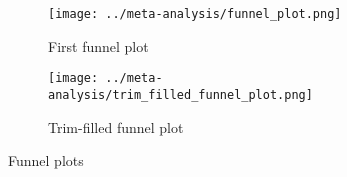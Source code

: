 \begin{figure}[p]

\centering

\begin{subfigure}[b]{0.4\textwidth}
\centering
\texttt{[image: ../meta-analysis/funnel\_plot.png]}
\caption{First funnel plot}
\label{fig:funnel_plot}
\end{subfigure}
\begin{subfigure}[b]{0.4\textwidth}
\centering
\texttt{[image: ../meta-analysis/trim\_filled\_funnel\_plot.png]}
\caption{Trim-filled funnel plot}
\label{fig:trim_filled_funnel_plot}
\end{subfigure}

\caption[Funnel plots]{Funnel plots}

\label{fig:funnels}
\end{figure}
